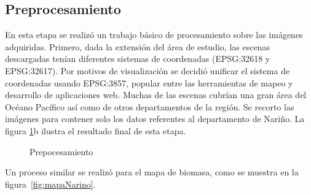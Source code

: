 \subsection{Preprocesamiento}

En esta etapa se realizó un trabajo básico de procesamiento sobre las imágenes adquiridas.  Primero, dada la extensión del área de estudio, las escenas descargadas tenían diferentes sistemas de coordenadas (EPSG:32618 y EPSG:32617).  Por motivos de visualización se decidió unificar el sistema de coordenadas usando EPSG:3857, popular entre las herramientas de mapeo y desarrollo de aplicaciones web.  Muchas de las escenas cubrían una gran área del Océano Pacífico así como de otros departamentos de la región.  Se recorto las imágenes para contener solo los datos referentes al departamento de Nariño.  La figura \ref{fig:cuts}b ilustra el resultado final de esta etapa.

\begin{figure}
  \centering
  \vfill
  \caption{Prepocesamiento}
  \label{fig:cuts}
\end{figure}

Un proceso similar se realizó para el mapa de biomasa, como se muestra en la figura~\ref{fig:mapaNarino}.

